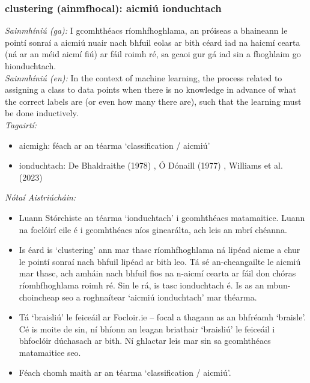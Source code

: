 \subsubsection*{clustering (ainmfhocal): aicmiú ionduchtach}
 \noindent \textit{Sainmhíniú (ga):} I gcomhthéacs ríomhfhoghlama, an próiseas a bhaineann le pointí sonraí a aicmiú nuair nach bhfuil eolas ar bith céard iad na haicmí cearta (ná ar an méid aicmí fiú) ar fáil roimh ré, sa gcaoi gur gá iad sin a fhoghlaim go hionduchtach.
\\
 \noindent \textit{Sainmhíniú (en):} In the context of machine learning, the process related to assigning a class to data points when there is no knowledge in advance of what the correct labels are (or even how many there are), such that the learning must be done inductively.
\\
 \noindent \textit{Tagairtí:}
\begin{itemize}
	\item aicmigh: féach ar an téarma `classification / aicmiú'
	\item ionduchtach: De Bhaldraithe (1978) \cite{de-bhaldraithe}, Ó Dónaill (1977) \cite{odonaill}, Williams et al. (2023) \cite{storchiste}
\end{itemize}

 \noindent \textit{Nótaí Aistriúcháin:}
\begin{itemize}
	\item Luann Stórchiste an téarma `ionduchtach' i gcomhthéacs matamaitice. Luann na foclóirí eile é i gcomhthéacs níos ginearálta, ach leis an mbrí chéanna.
	\item Is éard is `clustering' ann mar thasc ríomhfhoghlama ná lipéad aicme a chur le pointí sonraí nach bhfuil lipéad ar bith leo. Tá sé an-cheangailte le aicmiú mar thasc, ach amháin nach bhfuil fios na n-aicmí cearta ar fáil don chóras ríomhfhoghlama roimh ré. Sin le rá, is tasc ionduchtach é. Is as an mbun-choincheap seo a roghnaítear `aicmiú ionduchtach' mar théarma.
	\item Tá `braisliú' le feiceáil ar Focloir.ie -- focal a thagann as an bhfréamh `braisle'. Cé is moite de sin, ní bhíonn an leagan briathair `braisliú' le feiceáil i bhfoclóir dúchasach ar bith. Ní ghlactar leis mar sin sa gcomhthéacs matamaitice seo.
	\item Féach chomh maith ar an téarma `classification / aicmiú'.
\end{itemize}


